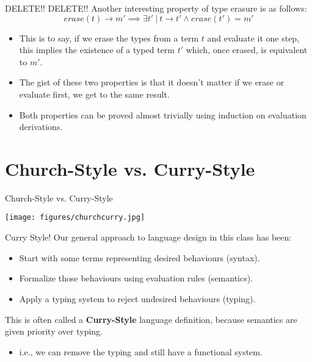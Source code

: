 \documentclass[11pt]{beamer}
\begin{document}
\begin{frame}[fragile=singleslide]{DELETE!! DELETE!!}
Another interesting property of type erasure is as follows:
\begin{equation}
erase(t) \rightarrow m' \implies \exists t' \:|\: t \rightarrow t' \land erase(t') = m'
\end{equation}
\begin{itemize}
\item This is to say, if we erase the types from a term $t$ and evaluate it one step, this implies the existence of a typed term $t'$ which, once erased, is equivalent to $m'$.
\item The gist of these two properties is that it doesn't matter if we erase or evaluate first, we get to the same result.
\item Both properties can be proved almost trivially using induction on evaluation derivations.  
\end{itemize}
\end{frame}

\section[C vs C]{Church-Style vs. Curry-Style}
\begin{frame}[fragile=singleslide]{Church-Style vs. Curry-Style}
\begin{center}
\texttt{[image: figures/churchcurry.jpg]}
\end{center}
\end{frame}


\begin{frame}[fragile=singleslide]{Curry Style!}
Our general approach to language design in this class has been:
\begin{itemize}
\item Start with some terms representing desired behaviours (syntax).
\item Formalize those behaviours using evaluation rules (semantics).
\item Apply a typing system to reject undesired behaviours (typing).  
\end{itemize}
This is often called a \textbf{Curry-Style} language definition, because semantics are given priority over typing.  
\begin{itemize}
\item i.e., we can remove the typing and still have a functional system. 
\end{itemize}
\end{frame}
\end{document}
